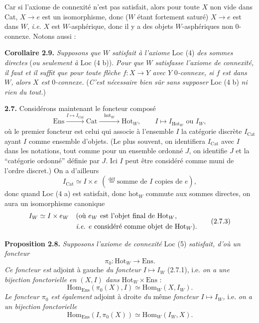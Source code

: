 \documentclass[11pt]{article}
\newcommand{\printedpage}[1]{\marginpar{\footnotesize p.~#1}}
\newcommand{\msp}[1]{\marginpar{\footnotesize [#1]}}
\begin{document}
Car si l'axiome de connexité n'est pas satisfait, alors pour toute $X$ non vide dans Cat, $X \longrightarrow e$ est un isomorphisme, donc ($W$ étant fortement saturé) $X \longrightarrow e$ est dans $W$, \textit{i.e.} $X$ est $W$-asphérique, donc il y a des objets $W$-asphériques non 0-connexe. Notons aussi : %

\textbf{Corollaire 2.9.} \textit{Supposons que $W$ satisfait à l'axiome} Loc (4) \textit{des sommes directes} (\textit{ou seulement à} Loc (4 b)). \textit{Pour que $W$ satisfasse l'axiome de connexité, il faut et il suffit que pour toute flèche $f : X \longrightarrow Y$ avec $Y$} 0\textit{-connexe, si $f$ est dans $W$, alors $X$ est} 0\textit{-connexe.} (\textit{C'est nécessaire bien sûr sans supposer} Loc (4 b) \textit{ni rien du tout.})

\msp{page 14}

\textbf{2.7.} Considérons maintenant le foncteur composé
\[
\mathrm{Ens} \xrightarrow{I \longmapsto I_{\mathrm{Cat}}} \mathrm{Cat} \xrightarrow{\quad \mathrm{hot}_W \quad} \mathrm{Hot}_W, \qquad I \longmapsto I_{\mathrm{Hot}_W} \text{ ou } I_W, \tag*{(2.7.1)}
\]
où le premier foncteur est celui qui associe à l'ensemble $I$ la catégorie discrète $I_{\mathrm{Cat}}$ ayant $I$ comme ensemble d'objets. (Le plus souvent, on identifiera $I_{\mathrm{Cat}}$ avec $I$ dans les notations, tout comme pour un ensemble ordonné $J$, on identifie $J$ et la “catégorie ordonné” %
définie par $J$. Ici $I$ peut être considéré comme muni de l'ordre discret.) On a d'ailleurs
\[
I_{\mathrm{Cat}} \simeq I \times e \ \ (\overset{\text{déf}}{=} \text{somme de $I$ copies de $e$}), \tag*{(2.7.2)}
\]
donc quand Loc (4 a) est satisfait, donc $\mathrm{hot}_W$ commute aux sommes directes, on aura un isomorphisme canonique
\[
\begin{aligned}
I_W \simeq I \times e_W \quad &\text{(où $e_W$ est l'objet final de $\mathrm{Hot}_W$,} \\
&\text{\textit{i.e.} $e$ considéré comme objet de $\mathrm{Hot}_W$).}
\end{aligned} \tag*{(2.7.3)}
\]

\printedpage{8}
\textbf{Proposition 2.8.} \textit{Supposons l'axiome de connexité} Loc (5) \textit{satisfait, d'où un foncteur}
\[
\pi_0 : \mathrm{Hot}_W \longrightarrow \mathrm{Ens}. \tag*{(2.8.1)}
\]
\textit{Ce foncteur est} adjoint à gauche \textit{du foncteur $I \longmapsto I_W$} (2.7.1), i.e. \textit{on a une bijection fonctorielle en $(X, I)$ dans} $\mathrm{Hot}_W \times \mathrm{Ens}$ :
\msp{page 15}
\[
\mathrm{Hom}_{\mathrm{Ens}}(\pi_0(X), I) \simeq \mathrm{Hom}_W(X, I_W). \tag*{(2.8.2)}
\]
\textit{Le foncteur $\pi_0$ est également} adjoint à droite \textit{du} même \textit{foncteur $I \longmapsto I_W$,} i.e. \textit{on a un bijection fonctorielle} %
\[
\mathrm{Hom}_{\mathrm{Ens}}(I, \pi_0(X)) \simeq \mathrm{Hom}_W(I_W, X). \tag*{(2.8.3)}
\]
\end{document}
